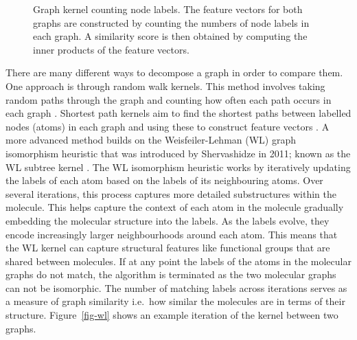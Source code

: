 \documentclass[
  super,
  preprint,
  3p]{elsarticle}
\begin{document}
\begin{figure}


\caption{\label{fig-count}Graph kernel counting node labels. The feature
vectors for both graphs are constructed by counting the numbers of node
labels in each graph. A similarity score is then obtained by computing
the inner products of the feature vectors.}

\end{figure}%

There are many different ways to decompose a graph in order to compare
them. One approach is through random walk kernels. This method involves
taking random paths through the graph and counting how often each path
occurs in each graph \citep{gartner_survey_2003}. Shortest path kernels
aim to find the shortest paths between labelled nodes (atoms) in each
graph and using these to construct feature vectors \citep{RN30}. A more
advanced method builds on the Weisfeiler-Lehman (WL) graph isomorphism
heuristic that was introduced by Shervashidze in 2011; known as the WL
subtree kernel \citep{RN46}. The WL isomorphism heuristic works by
iteratively updating the labels of each atom based on the labels of its
neighbouring atoms. Over several iterations, this process captures more
detailed substructures within the molecule. This helps capture the
context of each atom in the molecule gradually embedding the molecular
structure into the labels. As the labels evolve, they encode
increasingly larger neighbourhoods around each atom. This means that the
WL kernel can capture structural features like functional groups that
are shared between molecules. If at any point the labels of the atoms in
the molecular graphs do not match, the algorithm is terminated as the
two molecular graphs can not be isomorphic. The number of matching
labels across iterations serves as a measure of graph similarity
i.e.~how similar the molecules are in terms of their structure.
Figure~\ref{fig-wl} shows an example iteration of the kernel between two
graphs.
\end{document}
